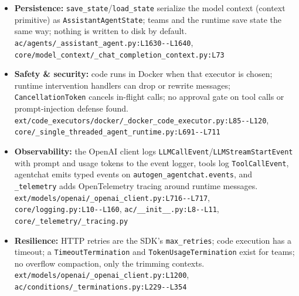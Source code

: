\begin{itemize}
\item \textbf{Persistence:} \texttt{save\_\allowbreak{}state}/\texttt{load\_\allowbreak{}state} serialize the model context (context primitive) as \texttt{AssistantAgentState}; teams and the runtime save state the same way; nothing is written to disk by default. \texttt{ac/\allowbreak{}agents/\allowbreak{}\_\allowbreak{}assistant\_\allowbreak{}agent.\allowbreak{}py:\allowbreak{}L1630-\allowbreak{}-\allowbreak{}L1640}, \texttt{core/\allowbreak{}model\_\allowbreak{}context/\allowbreak{}\_\allowbreak{}chat\_\allowbreak{}completion\_\allowbreak{}context.\allowbreak{}py:\allowbreak{}L73}
\item \textbf{Safety \& security:} code runs in Docker when that executor is chosen; runtime intervention handlers can drop or rewrite messages; \texttt{CancellationToken} cancels in-flight calls; no approval gate on tool calls or prompt-injection defense found. \texttt{ext/\allowbreak{}code\_\allowbreak{}executors/\allowbreak{}docker/\allowbreak{}\_\allowbreak{}docker\_\allowbreak{}code\_\allowbreak{}executor.\allowbreak{}py:\allowbreak{}L85-\allowbreak{}-\allowbreak{}L120}, \texttt{core/\allowbreak{}\_\allowbreak{}single\_\allowbreak{}threaded\_\allowbreak{}agent\_\allowbreak{}runtime.\allowbreak{}py:\allowbreak{}L691-\allowbreak{}-\allowbreak{}L711}
\item \textbf{Observability:} the OpenAI client logs \texttt{LLMCallEvent}/\texttt{LLMStreamStartEvent} with prompt and usage tokens to the event logger, tools log \texttt{ToolCallEvent}, agentchat emits typed events on \texttt{autogen\_\allowbreak{}agentchat.\allowbreak{}events}, and \texttt{\_\allowbreak{}telemetry} adds OpenTelemetry tracing around runtime messages. \texttt{ext/\allowbreak{}models/\allowbreak{}openai/\allowbreak{}\_\allowbreak{}openai\_\allowbreak{}client.\allowbreak{}py:\allowbreak{}L716-\allowbreak{}-\allowbreak{}L717}, \texttt{core/\allowbreak{}logging.\allowbreak{}py:\allowbreak{}L10-\allowbreak{}-\allowbreak{}L160}, \texttt{ac/\allowbreak{}\_\allowbreak{}\_\allowbreak{}init\_\allowbreak{}\_\allowbreak{}.\allowbreak{}py:\allowbreak{}L8-\allowbreak{}-\allowbreak{}L11}, \texttt{core/\allowbreak{}\_\allowbreak{}telemetry/\allowbreak{}\_\allowbreak{}tracing.\allowbreak{}py}
\item \textbf{Resilience:} HTTP retries are the SDK's \texttt{max\_\allowbreak{}retries}; code execution has a timeout; a \texttt{TimeoutTermination} and \texttt{TokenUsageTermination} exist for teams; no overflow compaction, only the trimming contexts. \texttt{ext/\allowbreak{}models/\allowbreak{}openai/\allowbreak{}\_\allowbreak{}openai\_\allowbreak{}client.\allowbreak{}py:\allowbreak{}L1200}, \texttt{ac/\allowbreak{}conditions/\allowbreak{}\_\allowbreak{}terminations.\allowbreak{}py:\allowbreak{}L229-\allowbreak{}-\allowbreak{}L354}

\end{itemize}
